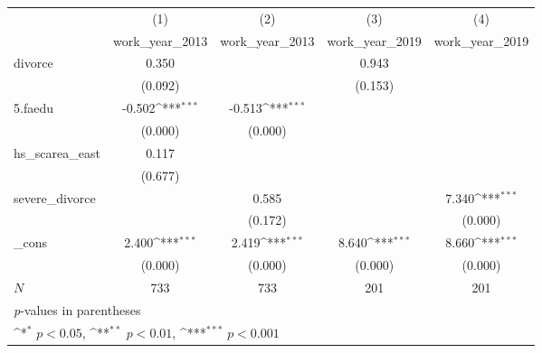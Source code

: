 {
\def\sym#1{\ifmmode^{#1}\else\(^{#1}\)\fi}
\begin{tabular}{l*{4}{c}}
\hline\hline
            &\multicolumn{1}{c}{(1)}&\multicolumn{1}{c}{(2)}&\multicolumn{1}{c}{(3)}&\multicolumn{1}{c}{(4)}\\
            &\multicolumn{1}{c}{work\_year\_2013}&\multicolumn{1}{c}{work\_year\_2013}&\multicolumn{1}{c}{work\_year\_2019}&\multicolumn{1}{c}{work\_year\_2019}\\
\hline
divorce     &       0.350         &                     &       0.943         &                     \\
            &     (0.092)         &                     &     (0.153)         &                     \\
[1em]
5.faedu     &      -0.502\sym{***}&      -0.513\sym{***}&                     &                     \\
            &     (0.000)         &     (0.000)         &                     &                     \\
[1em]
hs\_scarea\_east&       0.117         &                     &                     &                     \\
            &     (0.677)         &                     &                     &                     \\
[1em]
severe\_divorce&                     &       0.585         &                     &       7.340\sym{***}\\
            &                     &     (0.172)         &                     &     (0.000)         \\
[1em]
\_cons      &       2.400\sym{***}&       2.419\sym{***}&       8.640\sym{***}&       8.660\sym{***}\\
            &     (0.000)         &     (0.000)         &     (0.000)         &     (0.000)         \\
\hline
\(N\)       &         733         &         733         &         201         &         201         \\
\hline\hline
\multicolumn{5}{l}{\footnotesize \textit{p}-values in parentheses}\\
\multicolumn{5}{l}{\footnotesize \sym{*} \(p<0.05\), \sym{**} \(p<0.01\), \sym{***} \(p<0.001\)}\\
\end{tabular}
}
